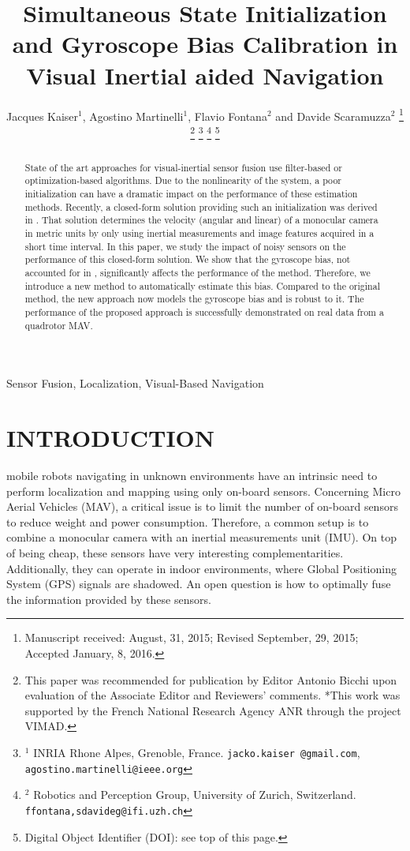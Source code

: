 \documentclass[letterpaper, 10pt, conference, final]{ieeeconf}  %
\title{Simultaneous State Initialization and Gyroscope Bias Calibration in Visual Inertial aided Navigation} %
\author{Jacques Kaiser$^{1}$, Agostino Martinelli$^{1}$, Flavio Fontana$^{2}$ and Davide Scaramuzza$^{2}$%
\thanks{Manuscript received: August, 31, 2015; Revised September, 29, 2015; Accepted January, 8, 2016.}%
\thanks{This paper was recommended for publication by Editor Antonio Bicchi upon evaluation of the Associate Editor and Reviewers' comments. *This work was supported by the French National Research Agency ANR through the project VIMAD.}%
\thanks{$^{1}$ INRIA Rhone Alpes, Grenoble, France. {\tt\small jacko.kaiser @gmail.com}, {\tt\small agostino.martinelli@ieee.org}}%
\thanks{$^{2}$ Robotics and Perception Group, University of Zurich, Switzerland. {\tt\small ffontana,sdavideg@ifi.uzh.ch}}%
\thanks{Digital Object Identifier (DOI): see top of this page.}
}
\begin{document}
\maketitle




\begin{abstract}
State of the art approaches for visual-inertial sensor fusion use filter-based or optimization-based algorithms. Due to the nonlinearity of the system, a poor initialization can have a dramatic impact on the performance of these estimation methods.
Recently, a closed-form solution providing such an initialization was derived in \cite{Martinelli2014}.
That solution determines the velocity (angular and linear) of a monocular camera in metric units by only using inertial measurements and image features acquired in a short time interval.
In this paper, we study the impact of noisy sensors on the performance of this closed-form solution. We show that the gyroscope bias, not accounted for in \cite{Martinelli2014}, significantly affects the performance of the method.
Therefore, we introduce a new method to automatically estimate this bias.
Compared to the original method, the new approach now models the gyroscope bias and is robust to it.
The performance of the proposed approach is successfully demonstrated on real data from a quadrotor MAV.
\end{abstract}

\begin{keywords}
  Sensor Fusion, Localization, Visual-Based Navigation
\end{keywords}


\section{INTRODUCTION}

 mobile robots navigating in unknown environments have an intrinsic need to perform localization and mapping using only on-board sensors.
Concerning Micro Aerial Vehicles (MAV), a critical issue is to limit the number of on-board sensors to reduce weight and power consumption.
Therefore, a common setup is to combine a monocular camera with an inertial measurements unit (IMU).
On top of being cheap, these sensors have very interesting complementarities.
Additionally, they can operate in indoor environments, where Global Positioning System (GPS) signals are shadowed.
An open question is how to optimally fuse the information provided by these sensors.
\end{document}
